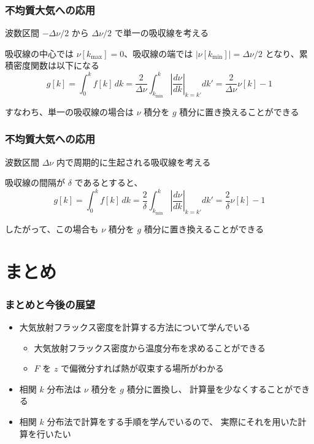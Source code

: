 \documentclass[unicode,colorlinks]{beamer}
\begin{document}
\begin{frame}
	\frametitle{不均質大気への応用}
	波数区間 $-\Delta\nu/2$ から $\Delta\nu/2$ で単一の吸収線を考える

	吸収線の中心では $\nu[k_{\mathrm{max}}]=0$、吸収線の端では
	$|\nu[k_{\mathrm{min}}]|=\Delta\nu/2$ となり、累積密度関数は以下になる
	\[
		g[k]=\int^k_0 f[k]\,dk
		=\frac{2}{\Delta\nu}\int^k_{k_{\mathrm{min}}}\left|\frac{d\nu}{dk}\right|_{k=k'}dk'
		=\frac{2}{\Delta\nu}\nu[k]-1
	\]

	すなわち、単一の吸収線の場合は $\nu$ 積分を $g$ 積分に置き換えることができる
\end{frame}

\begin{frame}
	\frametitle{不均質大気への応用}
	波数区間 $\Delta\nu$ 内で周期的に生起される吸収線を考える

	吸収線の間隔が $\delta$ であるとすると、
	\[
		g[k]=\int^k_0 f[k]\,dk
		=\frac{2}{\delta}\int^k_{k_{\mathrm{min}}}\left|\frac{d\nu}{dk}\right|_{k=k'}dk'
		=\frac{2}{\delta}\nu[k]-1
	\]

	したがって、この場合も $\nu$ 積分を $g$ 積分に置き換えることができる
\end{frame}

% 

\section{まとめ}

\begin{frame}
	\frametitle{まとめと今後の展望}
	\begin{itemize}
		\item 大気放射フラックス密度を計算する方法について学んでいる
		\begin{itemize}
			\item 大気放射フラックス密度から温度分布を求めることができる
			\item $F$ を $z$ で偏微分すれば熱が収束する場所がわかる
		\end{itemize}
		\item 相関 $k$ 分布法は $\nu$ 積分を $g$ 積分に置換し、
			計算量を少なくすることができる
	\end{itemize}
	
	\begin{itemize}
		\item 相関 $k$ 分布法で計算をする手順を学んでいるので、
			実際にそれを用いた計算を行いたい
	\end{itemize}
\end{frame}
\end{document}
